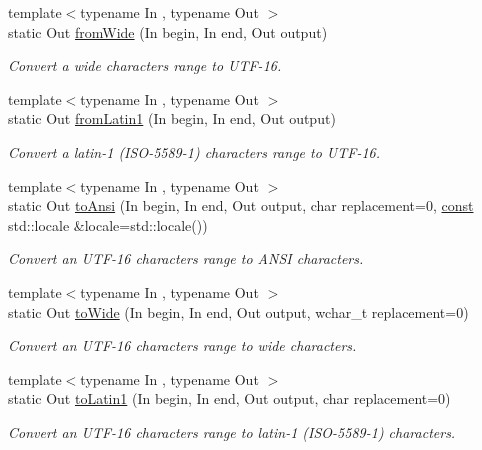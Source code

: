 \begin{DoxyCompactItemize}
{\footnotesize template$<$typename In , typename Out $>$ }\\static Out \hyperlink{classsf_1_1_utf_3_0116_01_4_a263423929b6f8e4d3ad09b45ac5cb0a1}{from\-Wide} (In begin, In end, Out output)
\begin{DoxyCompactList}\small\item\em Convert a wide characters range to U\-T\-F-\/16. \end{DoxyCompactList}\item 
{\footnotesize template$<$typename In , typename Out $>$ }\\static Out \hyperlink{classsf_1_1_utf_3_0116_01_4_a52293df75893733fe6cf84b8a017cbf7}{from\-Latin1} (In begin, In end, Out output)
\begin{DoxyCompactList}\small\item\em Convert a latin-\/1 (I\-S\-O-\/5589-\/1) characters range to U\-T\-F-\/16. \end{DoxyCompactList}\item 
{\footnotesize template$<$typename In , typename Out $>$ }\\static Out \hyperlink{classsf_1_1_utf_3_0116_01_4_a6d2bfbdfe46364bd49bca28a410b18f7}{to\-Ansi} (In begin, In end, Out output, char replacement=0, \hyperlink{term__entry_8h_a57bd63ce7f9a353488880e3de6692d5a}{const} std\-::locale \&locale=std\-::locale())
\begin{DoxyCompactList}\small\item\em Convert an U\-T\-F-\/16 characters range to A\-N\-S\-I characters. \end{DoxyCompactList}\item 
{\footnotesize template$<$typename In , typename Out $>$ }\\static Out \hyperlink{classsf_1_1_utf_3_0116_01_4_a42bace5988f7f20497cfdd6025c2d7f2}{to\-Wide} (In begin, In end, Out output, wchar\-\_\-t replacement=0)
\begin{DoxyCompactList}\small\item\em Convert an U\-T\-F-\/16 characters range to wide characters. \end{DoxyCompactList}\item 
{\footnotesize template$<$typename In , typename Out $>$ }\\static Out \hyperlink{classsf_1_1_utf_3_0116_01_4_ad0cc57ebf48fac584f4d5f3d30a20010}{to\-Latin1} (In begin, In end, Out output, char replacement=0)
\begin{DoxyCompactList}\small\item\em Convert an U\-T\-F-\/16 characters range to latin-\/1 (I\-S\-O-\/5589-\/1) characters. \end{DoxyCompactList}\item 

\end{DoxyCompactItemize}

